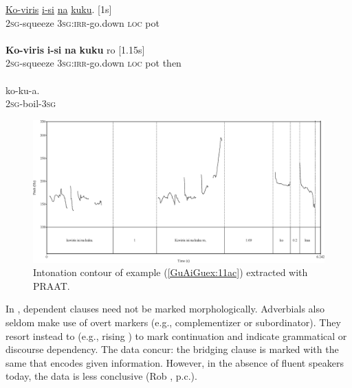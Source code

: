\documentclass[output=paper]{LSP/langsci}
\begin{document}
\begin{exe}
\ex \label{GuAiGuex:11ac}
\begin{xlist}
\ex \label{GuAiGuex:11a}
\gll \underline{Ko-viris}          \underline{i-si}                 \underline{na}     \underline{kuku}. [1s]\\
\textsc{2sg}-squeeze     \textsc{3sg:irr-}go.down   \textsc{loc}    pot \\
\glt {}\\
\ex \label{GuAiGuex:11b}
\gll \textbf{Ko-viris}          \textbf{i-si}               \textbf{na }    \textbf{kuku}   ro [1.15s] \\
\textsc{2sg}-squeeze     \textsc{3sg:irr-}go.down   \textsc{loc}    pot then\\
\glt {}\\
\ex \label{GuAiGuex:11c}
\gll   ko-ku-a.\\     	       
\textsc{2sg}-boil-\textsc{3sg}\\
\glt {} 
\end{xlist}
\end{exe}

\begin{figure}[ht]
\includegraphics[width=4.8in]{figures/guerinFig3x.eps}
\caption{Intonation contour of example (\ref{GuAiGuex:11ac}) extracted with PRAAT. \label{GuFig3}}
\end{figure}


In , dependent clauses need not be marked morphologically. Adverbials also seldom make use of overt  markers (e.g., complementizer or subordinator). They resort instead to  (e.g., rising ) to mark continuation and indicate grammatical or discourse dependency. The  data concur: the bridging clause is marked with the same  that encodes given information. However, in the absence of fluent speakers today, the  data is less conclusive (Rob \citeauthor{Pensalfini}, p.c.).\nocite{PRAAT}
\end{document}
